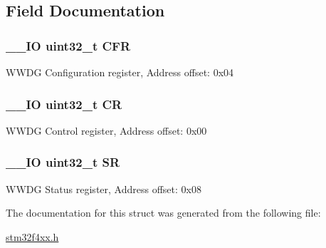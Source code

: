 \subsection{Field Documentation}
\hypertarget{struct_w_w_d_g___type_def_ac011ddcfe531f8e16787ea851c1f3667}{
\subsubsection[{C\-F\-R}]{\setlength{\rightskip}{0pt plus 5cm}\-\_\-\-\_\-\-I\-O uint32\-\_\-t C\-F\-R}}\label{struct_w_w_d_g___type_def_ac011ddcfe531f8e16787ea851c1f3667}
W\-W\-D\-G Configuration register, Address offset\-: 0x04 \hypertarget{struct_w_w_d_g___type_def_ab40c89c59391aaa9d9a8ec011dd0907a}{
\subsubsection[{C\-R}]{\setlength{\rightskip}{0pt plus 5cm}\-\_\-\-\_\-\-I\-O uint32\-\_\-t C\-R}}\label{struct_w_w_d_g___type_def_ab40c89c59391aaa9d9a8ec011dd0907a}
W\-W\-D\-G Control register, Address offset\-: 0x00 \hypertarget{struct_w_w_d_g___type_def_af6aca2bbd40c0fb6df7c3aebe224a360}{
\subsubsection[{S\-R}]{\setlength{\rightskip}{0pt plus 5cm}\-\_\-\-\_\-\-I\-O uint32\-\_\-t S\-R}}\label{struct_w_w_d_g___type_def_af6aca2bbd40c0fb6df7c3aebe224a360}
W\-W\-D\-G Status register, Address offset\-: 0x08 

The documentation for this struct was generated from the following file\-:\begin{DoxyCompactItemize}
\item 
\hyperlink{stm32f4xx_8h}{stm32f4xx.\-h}\end{DoxyCompactItemize}
